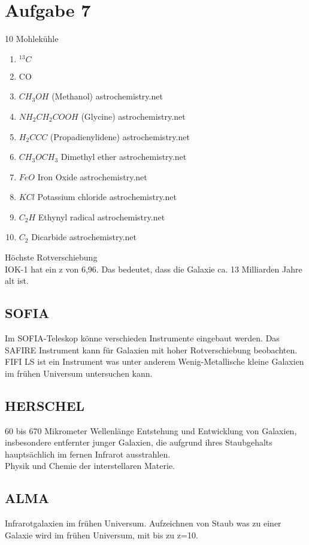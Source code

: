 \section{Aufgabe 7}
10 Mohlekühle
\begin{enumerate}
\item $^{13}C$
\item CO
\item $CH_{3}OH$ (Methanol) astrochemistry.net
\item $NH_2CH_2COOH$ (Glycine) astrochemistry.net
\item $H_2CCC$ (Propadienylidene) astrochemistry.net
\item $CH_3OCH_3$ Dimethyl ether astrochemistry.net
\item $FeO$	Iron Oxide astrochemistry.net
\item $KCl$	Potassium chloride astrochemistry.net
\item $C_2H$ Ethynyl radical astrochemistry.net
\item $C_2$ Dicarbide astrochemistry.net
\end{enumerate}
Höchste Rotverschiebung \\
IOK-1 \cite{iye2006galaxy} hat ein z von 6,96. Das bedeutet, dass die Galaxie ca. 13 Milliarden Jahre alt ist.
\subsection{SOFIA}
Im SOFIA-Teleskop könne verschieden Instrumente eingebaut werden. 
Das SAFIRE Instrument kann für Galaxien mit hoher Rotverschiebung beobachten.
FIFI LS ist ein Instrument was unter anderem Wenig-Metallische kleine Galaxien im frühen Universum untersuchen kann.
\subsection{HERSCHEL}
60 bis 670 Mikrometer Wellenlänge
Entstehung und Entwicklung von Galaxien, insbesondere entfernter junger Galaxien, die aufgrund ihres Staubgehalts hauptsächlich im fernen Infrarot ausstrahlen. \\
Physik und Chemie der interstellaren Materie.
\subsection{ALMA}
Infrarotgalaxien im frühen Universum. Aufzeichnen von Staub was zu einer Galaxie wird im frühen Universum, mit bis zu z=10.


